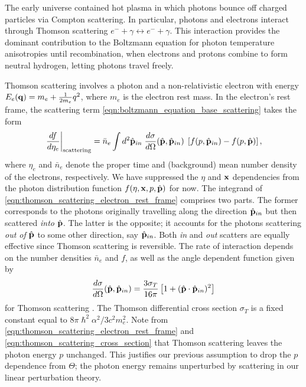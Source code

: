 The early universe contained hot plasma in which photons bounce off charged particles via Compton scattering. In particular, photons and electrons interact through Thomson scattering $e^- + \gamma \leftrightarrow e^- + \gamma$. This interaction provides the dominant contribution to the Boltzmann equation for photon temperature anisotropies until recombination, when electrons and protons combine to form neutral hydrogen, letting photons travel freely.

Thomson scattering involves a photon and a non-relativistic electron with energy $E_e (\mathbf{q}) = m_e + \frac{1}{2m_e} q^2$, where $m_e$ is the electron rest mass. In the electron's rest frame, the scattering term \eqref{eqn:boltzmann_equation_base_scattering} takes the form
\begin{align}
	\left. \frac{df}{d\eta_e} \right|_\text{scattering} = \bar{n}_e \int d^2 \hat{\mathbf{p}}_{in} \; \frac{d\sigma}{d\Omega} (\hat{\mathbf{p}}, \hat{\mathbf{p}}_{in}) \; \left[ f(p,\hat{\mathbf{p}}_{in}) - f(p,\hat{\mathbf{p}})\right], \label{eqn:thomson_scattering_electron_rest_frame}
\end{align}
where $\eta_e$ and $\bar{n}_e$ denote the proper time and (background) mean number density of the electrons, respectively. We have suppressed the $\eta$ and $\mathbf{x}$ dependencies from the photon distribution function $f(\eta,\mathbf{x},p,\hat{\mathbf{p}})$ for now. The integrand of \eqref{eqn:thomson_scattering_electron_rest_frame} comprises two parts. The former corresponds to the photons originally travelling along the direction $\hat{\mathbf{p}}_{in}$ but then scattered \textit{into} $\hat{\mathbf{p}}$. The latter is the opposite; it accounts for the photons scattering \textit{out of} $\hat{\mathbf{p}}$ to some other direction, say $\hat{\mathbf{p}}_{in}$. Both \textit{in} and \textit{out} scatters are equally effective since Thomson scattering is reversible. The rate of interaction depends on the number densities $\bar{n}_e$ and $f$, as well as the angle dependent function given by
\begin{align}
	\frac{d\sigma}{d\Omega} (\hat{\mathbf{p}}, \hat{\mathbf{p}}_{in}) = \frac{3\sigma_T}{16\pi} \left[ 1 + (\hat{\mathbf{p}} \cdot \hat{\mathbf{p}}_{in})^2 \right] \label{eqn:thomson_scattering_cross_section}
\end{align}
for Thomson scattering \cite{Dodelson2003textbook}. The Thomson differential cross section $\sigma_T$ is a fixed constant equal to $8\pi\hslash^2 \alpha^2 / 3c^2 m_e^2$. Note from \eqref{eqn:thomson_scattering_electron_rest_frame} and \eqref{eqn:thomson_scattering_cross_section} that Thomson scattering leaves the photon energy $p$ unchanged. This justifies our previous assumption to drop the $p$ dependence from $\Theta$; the photon energy remains unperturbed by scattering in our linear perturbation theory.

